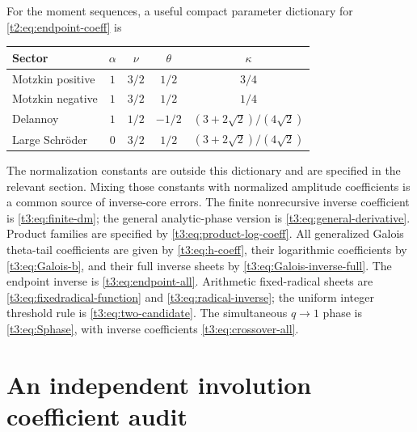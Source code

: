 \documentclass[11pt,openany]{book}
\numberwithin{equation}{chapter}
\theoremstyle{plain}
\theoremstyle{definition}
\theoremstyle{remark}
\begin{document}
For the moment sequences, a useful compact parameter dictionary for \eqref{t2:eq:endpoint-coeff} is
\begin{center}
\begin{tabular}{lcccc}
\toprule
Sector & $\alpha$ & $\nu$ & $\theta$ & $\kappa$\\\midrule
Motzkin positive & $1$ & $3/2$ & $1/2$ & $3/4$\\
Motzkin negative & $1$ & $3/2$ & $1/2$ & $1/4$\\
Delannoy & $1$ & $1/2$ & $-1/2$ & $(3+2\sqrt2)/(4\sqrt2)$\\
Large Schr\"oder & $0$ & $3/2$ & $1/2$ & $(3+2\sqrt2)/(4\sqrt2)$\\\bottomrule
\end{tabular}
\end{center}
The normalization constants are outside this dictionary and are specified in the relevant section. Mixing those constants with normalized amplitude coefficients is a common source of inverse-core errors.
The finite nonrecursive inverse coefficient is \eqref{t3:eq:finite-dm}; the general analytic-phase version is \eqref{t3:eq:general-derivative}. Product families are specified by \eqref{t3:eq:product-log-coeff}. All generalized Galois theta-tail coefficients are given by \eqref{t3:eq:h-coeff}, their logarithmic coefficients by \eqref{t3:eq:Galois-b}, and their full inverse sheets by \eqref{t3:eq:Galois-inverse-full}. The endpoint inverse is \eqref{t3:eq:endpoint-all}. Arithmetic fixed-radical sheets are \eqref{t3:eq:fixedradical-function} and \eqref{t3:eq:radical-inverse}; the uniform integer threshold rule is \eqref{t3:eq:two-candidate}. The simultaneous $q\to1$ phase is \eqref{t3:eq:Sphase}, with inverse coefficients \eqref{t3:eq:crossover-all}.

\chapter{An independent involution coefficient audit}
\label{ct:app:audit}
\end{document}
